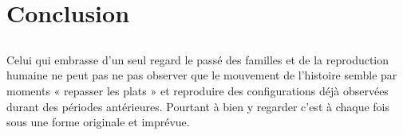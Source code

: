 
\part{Conclusion}

\chapter[Conclusion]{}


 Celui qui embrasse d'un seul regard le passé des familles et de la reproduction humaine ne peut pas ne pas observer que le mouvement de l'histoire semble par moments « repasser les plats » et reproduire des configurations déjà observées durant des périodes antérieures. Pourtant à bien y regarder c'est à chaque fois sous une forme originale et imprévue.  
 
